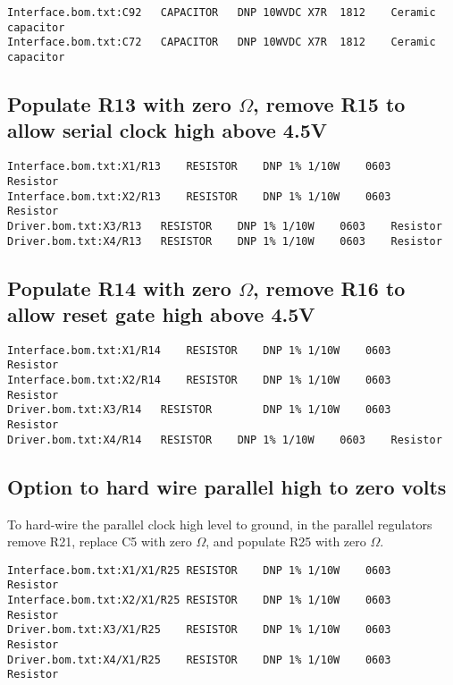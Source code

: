 \documentclass[11pt]{article}
\begin{document}
\begin{verbatim}
Interface.bom.txt:C92	CAPACITOR	DNP	10WVDC X7R	1812	Ceramic capacitor	
Interface.bom.txt:C72	CAPACITOR	DNP	10WVDC X7R	1812	Ceramic capacitor	
 \end{verbatim}

\subsection{Populate R13 with zero $\Omega$, remove R15 to allow serial clock high above 4.5V}
\begin{verbatim}
Interface.bom.txt:X1/R13	RESISTOR	DNP	1% 1/10W	0603	Resistor	
Interface.bom.txt:X2/R13	RESISTOR	DNP	1% 1/10W	0603	Resistor	
Driver.bom.txt:X3/R13	RESISTOR	DNP	1% 1/10W	0603	Resistor	
Driver.bom.txt:X4/R13	RESISTOR	DNP	1% 1/10W	0603	Resistor	
\end{verbatim}

\subsection{Populate R14 with zero $\Omega$, remove R16 to allow reset gate high above 4.5V}
\begin{verbatim}
Interface.bom.txt:X1/R14	RESISTOR	DNP	1% 1/10W	0603	Resistor	
Interface.bom.txt:X2/R14	RESISTOR	DNP	1% 1/10W	0603	Resistor	
Driver.bom.txt:X3/R14	RESISTOR		DNP	1% 1/10W	0603	Resistor	
Driver.bom.txt:X4/R14	RESISTOR	DNP	1% 1/10W	0603	Resistor	
\end{verbatim}
\subsection{Option to hard wire parallel high to zero volts}

To hard-wire the parallel clock high level to ground, in the parallel regulators
remove R21,
replace C5 with zero $\Omega$, and
populate R25 with zero $\Omega$.

\begin{verbatim}
Interface.bom.txt:X1/X1/R25	RESISTOR	DNP	1% 1/10W	0603	Resistor	
Interface.bom.txt:X2/X1/R25	RESISTOR	DNP	1% 1/10W	0603	Resistor	
Driver.bom.txt:X3/X1/R25	RESISTOR	DNP	1% 1/10W	0603	Resistor	
Driver.bom.txt:X4/X1/R25	RESISTOR	DNP	1% 1/10W	0603	Resistor	
\end{verbatim}
\end{document}
